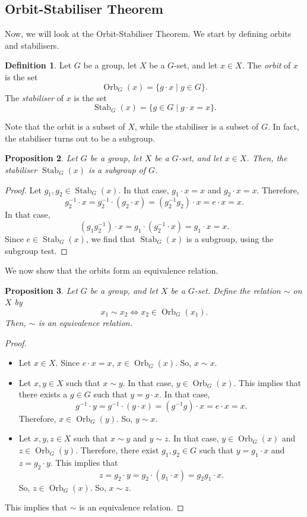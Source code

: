 \documentclass[a4paper, openany]{memoir}
\theoremstyle{definition}
\newtheorem{definition}{Definition}[section]
\theoremstyle{plain}
\newtheorem{proposition}[definition]{Proposition}
\begin{document}
\subsection{Orbit-Stabiliser Theorem}
Now, we will look at the Orbit-Stabiliser Theorem. We start by defining orbits and stabilisers.
\begin{definition}
Let $G$ be a group, let $X$ be a $G$-set, and let $x \in X$. The \emph{orbit} of $x$ is the set
\[\operatorname{Orb}_G(x) = \{g \cdot x \mid g \in G\}.\]
The \emph{stabiliser} of $x$ is the set
\[\operatorname{Stab}_G(x) = \{g \in G \mid g \cdot x = x\}.\]
\end{definition}
\noindent Note that the orbit is a subset of $X$, while the stabiliser is a subset of $G$. In fact, the stabiliser turns out to be a subgroup.
\begin{proposition}
Let $G$ be a group, let $X$ be a $G$-set, and let $x \in X$. Then, the stabiliser $\operatorname{Stab}_G(x)$ is a subgroup of $G$.
\end{proposition}
\begin{proof}
Let $g_1, g_2 \in \operatorname{Stab}_G(x)$. In that case, $g_1 \cdot x = x$ and $g_2 \cdot x = x$. Therefore,
\[g_2^{-1} \cdot x = g_2^{-1} \cdot (g_2 \cdot x) = (g_2^{-1}g_2) \cdot x = e \cdot x = x.\]
In that case,
\[(g_1 g_2^{-1}) \cdot x = g_1 \cdot (g_2^{-1} \cdot x) = g_1 \cdot x = x.\]
Since $e \in \operatorname{Stab}_G(x)$, we find that $\operatorname{Stab}_G(x)$ is a subgroup, using the subgroup test.
\end{proof}
\noindent We now show that the orbits form an equivalence relation.
\begin{proposition}
Let $G$ be a group, and let $X$ be a $G$-set. Define the relation $\sim$ on $X$ by
\[x_1 \sim x_2 \iff x_2 \in \operatorname{Orb}_G(x_1).\]
Then, $\sim$ is an equivalence relation.
\end{proposition}
\begin{proof}
\hspace*{0pt}
\begin{itemize}
    \item Let $x \in X$. Since $e \cdot x = x$, $x \in \operatorname{Orb}_G(x)$. So, $x \sim x$.
    
    \item Let $x, y \in X$ such that $x \sim y$. In that case, $y \in \operatorname{Orb}_G(x)$. This implies that there exists a $g \in G$ such that $y = g \cdot x$. In that case,
    \[g^{-1} \cdot y = g^{-1} \cdot (g \cdot x) = (g^{-1} g) \cdot x = e \cdot x = x.\]
    Therefore, $x \in \operatorname{Orb}_G(y)$. So, $y \sim x$.
    
    \item Let $x, y, z \in X$ such that $x \sim y$ and $y \sim z$. In that case, $y \in \operatorname{Orb}_G(x)$ and $z \in \operatorname{Orb}_G(y)$. Therefore, there exist $g_1, g_2 \in G$ such that $y = g_1 \cdot x$ and $z = g_2 \cdot y$. This implies that
    \[z = g_2 \cdot y = g_2 \cdot (g_1 \cdot x) = g_2g_1 \cdot x.\]
    So, $z \in \operatorname{Orb}_G(x)$. So, $x \sim z$.
\end{itemize}
This implies that $\sim$ is an equivalence relation.
\end{proof}
\end{document}
